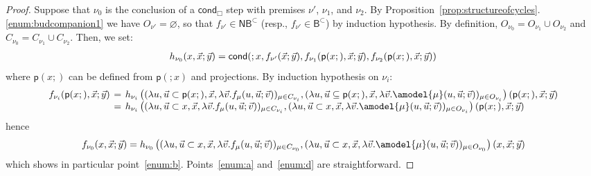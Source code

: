 \documentclass[manuscript,screen]{acmart}
\renewcommand{\emptyset}{\varnothing}
\theoremstyle{definition}
\theoremstyle{remark}
\newcommand{\permpref}{\subset}
\newcommand{\sq}{\Box}
\newcommand{\pred}{\mathsf{p}}
\newcommand{\cnd}{\mathsf{cond}}
\newcommand{\model}[1]{\denot{#1}}
\newcommand{\denot}[1]{f_{#1}}
\newcommand{\bc}{\mathsf{B}}
\newcommand{\bcwfpo}[1]{\bc^{#1}}
\newcommand{\nested}{\mathsf{N}}
\newcommand{\nbcwfpo}[1]{\nested\bcwfpo{#1}}
\newcommand{\bcpp}{\bcwfpo{\permpref}}
\newcommand{\nbcpp}{\nbcwfpo{\permpref}}
\newcommand{\close}[1]{{C}_{#1}}
\newcommand{\open}[1]{{O}_{#1}}
\newcommand{\hnu}{\nu_0}
\begin{document}
\begin{proof}
Suppose that $\hnu$ is the conclusion of a $\cnd_\sq$ step with premises $\nu'$, $\nu_1$, and $\nu_2$. By Proposition~\ref{prop:structureofcycles}.\ref{enum:budcompanion1} we have $\open{\nu'}=\emptyset$, so that $\model{{\nu'}}\in \nbcpp$ (resp., $\model{{\nu'}}\in \bcpp$) by induction hypothesis.  By definition,  $\open \hnu=\open{\nu_1}\cup \open{\nu_2}$ and  $\close \hnu=\close{\nu_1}\cup \close{\nu_2}$. Then, we set:
\[
\arraycolsep=2pt
    \begin{array}{c}
    h_{ \hnu}(x, \vec{x}; \vec{y})
    = \cnd(;x,  \model{{\nu'}}(\vec{x}; \vec{y}), \model{{\nu_1}}(\pred(x;),\vec{x}; \vec{y}) , \model{{\nu_2}}(\pred(x;), \vec{x}; \vec{y}))
  \end{array}
  \]
  where $\pred(x;)$ can be defined from $\pred(;x)$ and projections.  By induction hypothesis on $\nu_i$:
  \[
  \arraycolsep=2pt
      \begin{array}{rcl}
       \model{{\nu_i} }(\pred(x;), \vec{x}; \vec{y})
       &=&
       h_{\nu_i}\left(( \lambda u,\vec{u}\subset \pred(x;),\vec{x}, \lambda \vec{v}. \model{{\mu}}(u,\vec{u};\vec{v}))_{\mu \in \close{\nu_i}}, ( \lambda u,\vec{u}\subseteq \pred(x;),\vec{x}, \lambda \vec{v}. \amodel{{\mu}}(u,\vec{u};\vec{v}))_{\mu \in\open{\nu_i}} \right)(\pred(x;),\vec{x}; \vec{y})\\
       &=&
       h_{\nu_i}\left(( \lambda u,\vec{u}\subset x,\vec{x}, \lambda \vec{v}. \model{{\mu}}(u,\vec{u};\vec{v}))_{\mu \in \close{\nu_i}}, ( \lambda u,\vec{u}\subset x,\vec{x}, \lambda \vec{v}. \amodel{{\mu}}(u,\vec{u};\vec{v}))_{\mu \in\open{\nu_i}} \right)(\pred(x;),\vec{x}; \vec{y})\\
      \end{array}
\]
  hence 
  \[
  \arraycolsep=2pt
  \begin{array}{c}
        \model{ \hnu}(x, \vec{x}; \vec{y})
        =
        h_{\hnu}\left(( \lambda u,\vec{u}\subset x,\vec{x}, \lambda \vec{v}. \model{{\mu}}(u,\vec{u};\vec{v}))_{\mu \in \close{\hnu}}, ( \lambda u,\vec{u}\subset x,\vec{x}, \lambda \vec{v}. \amodel{{\mu}}(u,\vec{u};\vec{v}))_{\mu \in\open{\hnu}} \right)(x,\vec{x}; \vec{y})\\
  \end{array}
  \]
  which shows in particular point~\ref{enum:b}. Points~\ref{enum:a} and~\ref{enum:d} are straightforward.


\end{proof}
\end{document}
